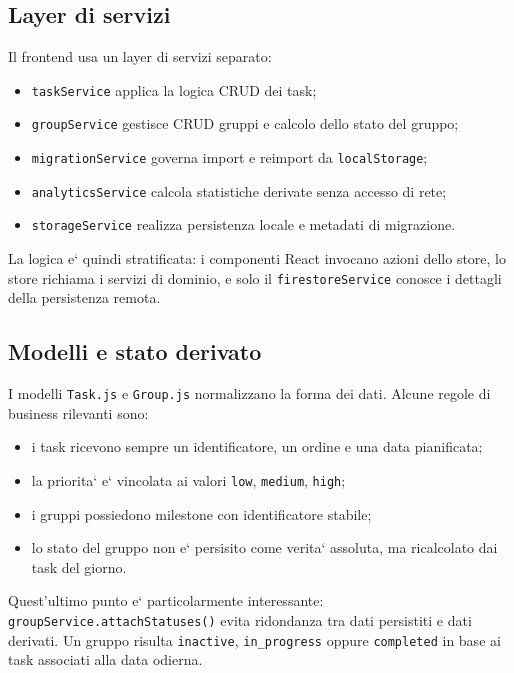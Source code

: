 \documentclass[11pt,a4paper]{article}
\begin{document}
\subsection{Layer di servizi}

Il frontend usa un layer di servizi separato:

\begin{itemize}
  \item \texttt{taskService} applica la logica CRUD dei task;
  \item \texttt{groupService} gestisce CRUD gruppi e calcolo dello stato del gruppo;
  \item \texttt{migrationService} governa import e reimport da \texttt{localStorage};
  \item \texttt{analyticsService} calcola statistiche derivate senza accesso di rete;
  \item \texttt{storageService} realizza persistenza locale e metadati di migrazione.
\end{itemize}

La logica e` quindi stratificata: i componenti React invocano azioni dello store, lo store richiama i servizi di dominio, e solo il \texttt{firestoreService} conosce i dettagli della persistenza remota.

\subsection{Modelli e stato derivato}

I modelli \texttt{Task.js} e \texttt{Group.js} normalizzano la forma dei dati. Alcune regole di business rilevanti sono:

\begin{itemize}
  \item i task ricevono sempre un identificatore, un ordine e una data pianificata;
  \item la priorita` e` vincolata ai valori \texttt{low}, \texttt{medium}, \texttt{high};
  \item i gruppi possiedono milestone con identificatore stabile;
  \item lo stato del gruppo non e` persisito come verita` assoluta, ma ricalcolato dai task del giorno.
\end{itemize}

Quest'ultimo punto e` particolarmente interessante: \texttt{groupService.attachStatuses()} evita ridondanza tra dati persistiti e dati derivati. Un gruppo risulta \texttt{inactive}, \texttt{in\_progress} oppure \texttt{completed} in base ai task associati alla data odierna.
\end{document}
